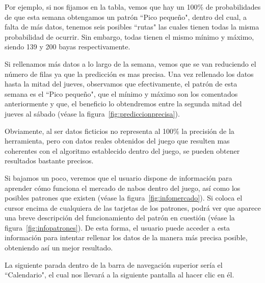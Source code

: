 Por ejemplo, si nos fijamos en la tabla, vemos que hay un 100\% de probabilidades de que esta semana obtengamos un patrón ``Pico pequeño", dentro del cual, a falta de más datos, tenemos seis posibles ``rutas" las cuales tienen todas la misma probabilidad de ocurrir. Sin embargo, todas tienen el mismo mínimo y máximo, siendo 139 y 200 bayas respectivamente.\\ 


Si rellenamos más datos a lo largo de la semana, vemos que se van reduciendo el número de filas ya que la predicción es mas precisa. Una vez rellenado los datos hasta la mitad del jueves, observamos que efectivamente, el patrón de esta semana es el ``Pico pequeño", que el mínimo y  máximo son los comentados anteriormente y que, el beneficio lo obtendremos entre la segunda mitad del jueves al sábado {(v\'ease la figura~\ref{fig:prediccionprecisa})}.\\

\clearpage

Obviamente, al ser datos ficticios no representa al 100\% la precisión de la herramienta, pero con datos reales obtenidos del juego que resulten mas coherentes con el algoritmo establecido dentro del juego, se pueden obtener resultados bastante precisos.\\


Si bajamos un poco, veremos que el usuario dispone de información para aprender cómo funciona el mercado de nabos dentro del juego, así como los posibles patrones que existen {(v\'ease la figura~\ref{fig:infomercado})}. Si coloca el cursor encima de cualquiera de las tarjetas de los patrones, podrá ver que aparece una breve descripción del funcionamiento del patrón en cuestión {(v\'ease la figura~\ref{fig:infopatrones})}. De esta forma, el usuario puede acceder a esta información para intentar rellenar los datos de la manera más precisa posible, obteniendo así un mejor resultado.\\


\clearpage

La siguiente parada dentro de la barra de navegación superior sería el ``Calendario", el cual nos llevará a la siguiente pantalla al hacer clic en él.\\

